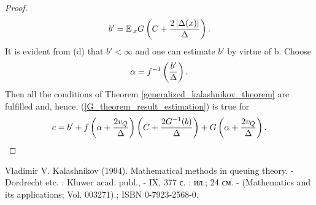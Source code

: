 \begin{proof}
\begin{gather}
		b' = \operatorname*{\mathbb{E}}{}_{x}G\left(C + \frac{2\left|\Delta(x)\right|}{\Delta}\right).
		\label{G_theorem_b'_constant}
		\end{gather}
		It is evident from (d) that $b' < \infty$ and one can estimate $b'$ by virtue of b. Choose
		\begin{gather}
		\alpha = f^{-1}\left(\frac{b'}{\Delta}\right).
		\label{G_theorem_alpha_constant}
		\end{gather}
		Then all the conditions of Theorem \ref{generalized_kalashnikov_theorem} are fulfilled and, hence, (\ref{G_theorem_result_estimation}) is true for
		\begin{gather}
		c = b' + f\left(\alpha + \frac{2v_{Q}}{\Delta}\right)\left(C + \frac{2G^{-1}(b)}{\Delta}\right) + G\left(\alpha + \frac{2v_{Q}}{\Delta}\right).
		\label{G_theorem_c_constant}
		\end{gather}
	\end{proof}
	
	\begin{thebibliography}{1}
		\bigskip
		\footnotesize
		Vladimir V. Kalashnikov (1994). Mathematical methods in queuing theory. - Dordrecht etc. : Kluwer acad. publ., - IX, 377 с. : ил.; 24 см. - (Mathematics and its applications; Vol. 003271).; ISBN 0-7923-2568-0.
		
	\end{thebibliography}
	
	
	
	
	
	
	
	
	


